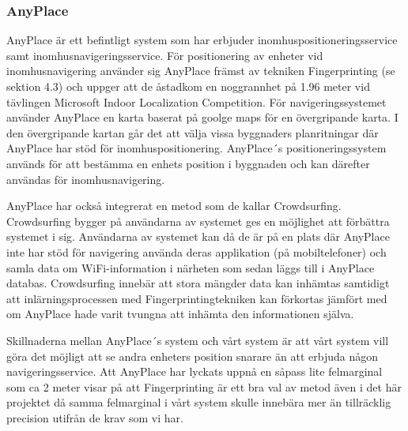 \documentclass[swedish, a4paper,12pt]{article}
\begin{document}
\subsubsection{AnyPlace}
AnyPlace är ett befintligt system som har erbjuder inomhuspositioneringsservice samt inomhusnavigeringsservice. För positionering av enheter vid inomhusnavigering använder sig AnyPlace främst av tekniken Fingerprinting (se sektion 4.3) och uppger att de åstadkom en noggrannhet på 1.96 meter vid tävlingen Microsoft Indoor Localization Competition.\cite{anyplace}
\cite{IPS_tavling}
För navigeringssystemet använder AnyPlace en karta baserat på goolge maps för en övergripande karta. I den övergripande kartan går det att välja vissa byggnaders planritningar där AnyPlace har stöd för inomhuspositionering. AnyPlace´s positioneringssystem används för att bestämma en enhets position i byggnaden och kan därefter användas för inomhusnavigering.

AnyPlace har också integrerat en metod som de kallar Crowdsurfing.\cite{anyplace} Crowdsurfing bygger på användarna av systemet ges en möjlighet att förbättra systemet i sig. Användarna av systemet kan då de är på en plats där AnyPlace inte har stöd för navigering använda deras applikation (på mobiltelefoner) och samla data om WiFi-information i närheten som sedan läggs till i AnyPlace databas. Crowdsurfing innebär att stora mängder data kan inhämtas samtidigt att inlärningsprocessen med Fingerprintingtekniken kan förkortas jämfört med om AnyPlace hade varit tvungna att inhämta den informationen själva.

Skillnaderna mellan AnyPlace´s system och vårt system är att vårt system vill göra det möjligt att se andra enheters position snarare än att erbjuda någon navigeringsservice. Att AnyPlace har lyckats uppnå en såpass lite felmarginal som ca 2 meter visar på att Fingerprinting är ett bra val av metod även i det här projektet då samma felmarginal i vårt system skulle innebära mer än tillräcklig precision utifrån de krav som vi har.

\end{document}
